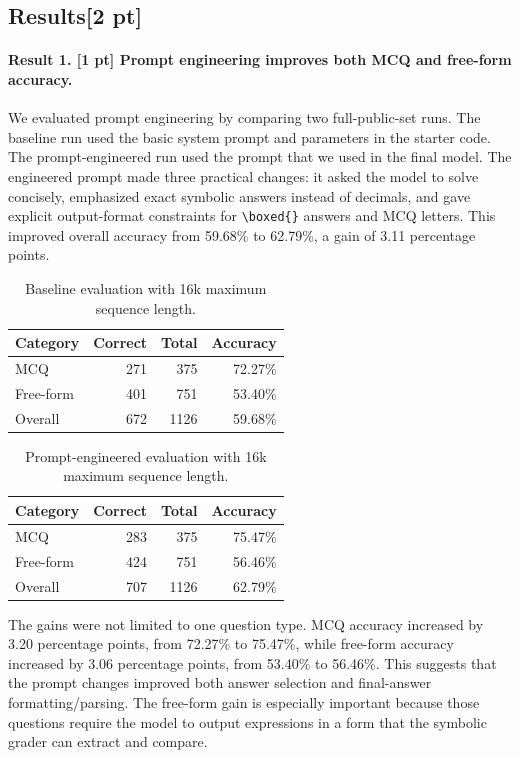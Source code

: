 \documentclass{article}
\begin{document}
\subsection{Results[2 pt]}
\label{sec:results}
\paragraph{Result 1. [1 pt] Prompt engineering improves both MCQ and free-form accuracy.}
We evaluated prompt engineering by comparing two full-public-set runs.  The baseline run used the basic system prompt and parameters in the starter code.  The prompt-engineered run used the prompt that we used in the final model.  The engineered prompt made three practical changes: it asked the model to solve concisely, emphasized exact symbolic answers instead of decimals, and gave explicit output-format constraints for \texttt{\textbackslash boxed\{\}} answers and MCQ letters.  This improved overall accuracy from 59.68\% to 62.79\%, a gain of 3.11 percentage points.

\begin{table}[t]
  \caption{Baseline evaluation with 16k maximum sequence length.}
  \label{tab:baseline_16k_results}
  \centering
  \begin{tabular}{lrrr}
    \toprule
    Category & Correct & Total & Accuracy \\
    \midrule
    MCQ & 271 & 375 & 72.27\% \\
    Free-form & 401 & 751 & 53.40\% \\
    Overall & 672 & 1126 & 59.68\% \\
    \bottomrule
  \end{tabular}
\end{table}

\begin{table}[t]
  \caption{Prompt-engineered evaluation with 16k maximum sequence length.}
  \label{tab:prompt_16k_results}
  \centering
  \begin{tabular}{lrrr}
    \toprule
    Category & Correct & Total & Accuracy \\
    \midrule
    MCQ & 283 & 375 & 75.47\% \\
    Free-form & 424 & 751 & 56.46\% \\
    Overall & 707 & 1126 & 62.79\% \\
    \bottomrule
  \end{tabular}
\end{table}

The gains were not limited to one question type.  MCQ accuracy increased by 3.20 percentage points, from 72.27\% to 75.47\%, while free-form accuracy increased by 3.06 percentage points, from 53.40\% to 56.46\%.  This suggests that the prompt changes improved both answer selection and final-answer formatting/parsing.  The free-form gain is especially important because those questions require the model to output expressions in a form that the symbolic grader can extract and compare.
\end{document}

